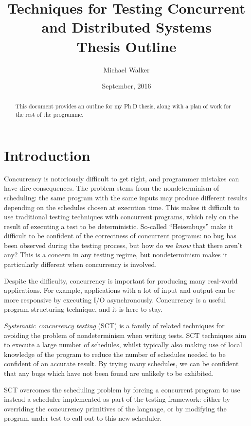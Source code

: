 \documentclass{article}
\title{Techniques for Testing Concurrent and Distributed Systems \\ \large Thesis Outline}
\author{Michael Walker}
\date{September, 2016}
\begin{document}
\maketitle

\begin{abstract}
  This document provides an outline for my Ph.D thesis, along with a
  plan of work for the rest of the programme.
\end{abstract}

\tableofcontents

\pagebreak

\section{Introduction}

Concurrency is notoriously difficult to get right\cite{yang2013}, and
programmer mistakes can have dire consequences\cite{leveson1993}. The
problem stems from the nondeterminism of scheduling: the same program
with the same inputs may produce different results depending on the
schedules chosen at execution time. This makes it difficult to use
traditional testing techniques with concurrent programs, which rely on
the result of executing a test to be deterministic. So-called
``Heisenbugs'' make it difficult to be confident of the correctness of
concurrent programs: no bug has been observed during the testing
process, but how do we \emph{know} that there aren't any? This is a
concern in any testing regime, but nondeterminism makes it
particularly different when concurrency is involved.

Despite the difficulty, concurrency is important for producing many
real-world applications. For example, applications with a lot of input
and output can be more responsive by executing I/O asynchronously.
Concurrency is a useful program structuring technique, and it is here
to stay.

\emph{Systematic concurrency testing}
(SCT)\cite{emmi2011,musuvathi2007,musuvathi2008,thomson2014} is a
family of related techniques for avoiding the problem of
nondeterminism when writing tests. SCT techniques aim to execute a
large number of schedules, whilst typically also making use of local
knowledge of the program to reduce the number of schedules needed to
be confident of an accurate result. By trying many schedules, we can
be confident that any bugs which have not been found are unlikely to
be exhibited.

SCT overcomes the scheduling problem by forcing a concurrent program
to use instead a scheduler implemented as part of the testing
framework: either by overriding the concurrency primitives of the
language, or by modifying the program under test to call out to this
new scheduler.
\end{document}
